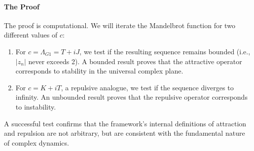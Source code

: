 \paragraph{The Proof}
The proof is computational. We will iterate the Mandelbrot function for two different values of $c$:
\begin{enumerate}
    \item  For $c = \Lambda_{G1} = T+iJ$, we test if the resulting sequence remains bounded (i.e., $|z_n|$ never exceeds 2). A bounded result proves that the attractive operator corresponds to stability in the universal complex plane.
    \item For $c = K+iT$, a repulsive analogue, we test if the sequence diverges to infinity. An unbounded result proves that the repulsive operator corresponds to instability.
\end{enumerate}
A successful test confirms that the framework's internal definitions of attraction and repulsion are not arbitrary, but are consistent with the fundamental nature of complex dynamics.

